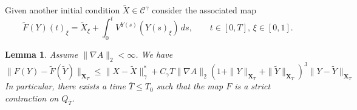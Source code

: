 \documentclass[a4paper,12pt,reqno]{amsart}
\newcommand{\wt}{\widetilde}
\newcommand{\norm}[1]{\|#1\|}
\newtheorem{lemma}{Lemma}
\newcommand{\CC}{\mathscr{C}}
\newcommand{\XT}{\mathbf{X}_T}
\begin{document}
Given another initial condition $\wt X \in \CC^\gamma$ consider the
associated map
\begin{equation}
  \label{eq:fmap-tilde}
\wt F(Y)(t)_\xi = \wt X_\xi + \int_0^t V^{Y(s)}(Y(s)_{\xi}) \, ds  ,\qquad t
\in[0,T],\, \xi \in [0,1].
\end{equation}

\begin{lemma}
\label{lemma:uniqueness-young}
 Assume $\|\nabla A\|_2 < \infty$. We have
 \begin{equation}
   \label{eq:lipshitz-bound-young}
\|F(Y)-\wt F(\wt Y)\|_{\XT}   \le \|X-\wt X\|_{\gamma}^* +
C_\gamma T \norm{\nabla A}_2  
 (1+\norm{Y}_{\XT}+\norm{\wt Y}_{\XT})^3
 \norm{Y-\wt
 Y}_{\XT}   
 \end{equation}
In particular, there exists a time $\overline{T} \le T_0$ such that the
map $F$ is a strict contraction on $Q_{\overline{T}}$.
\end{lemma}
\end{document}
